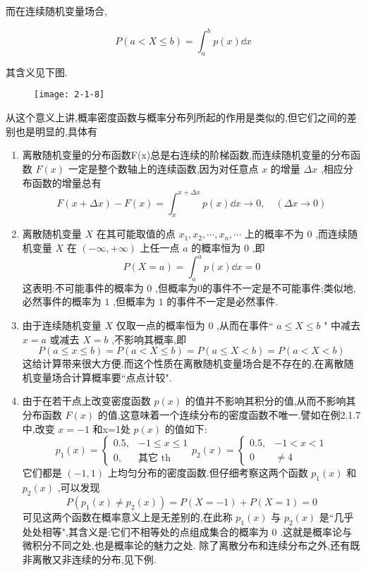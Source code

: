 而在连续随机变量场合,

\[ 
P(a<X \leqslant b)=\int_{a}^{b} p(x) \dd x
\]

其含义见下图.



\begin{figure}
	\centering
	\texttt{[image: 2-1-8]}
	\caption{}
	\label{fig:2.1.8}
\end{figure}

从这个意义上讲,概率密度函数与概率分布列所起的作用是类似的,但它们之间的差别也是明显的,具体有

\begin{enumerate}
	\item 离散随机变量的分布函数F(x)总是右连续的阶梯函数,而连续随机变量的分布函数 $ F(x) $ 一定是整个数轴上的连续函数,因为对任意点 $ x $ 的增量 $ \Delta x $ ,相应分布函数的增量总有
	\[ 
	F(x+\Delta x)-F(x)=\int_{x}^{x+\Delta x} p(x) \dd x \longrightarrow 0, \quad(\Delta x \rightarrow 0)
	\]
	\item 离散随机变量 $ X $ 在其可能取值的点 $ x_{1}, x_{2}, \cdots, x_{n}, \cdots $ 上的概率不为 $ 0 $ ,而连续随机变量 $ X $ 在 $ (-\infty,+\infty) $ 上任一点 $ a $ 的概率恒为 $ 0 $ ,即
	\[ 
	P(X=a)=\int_{a}^{a} p(x) \dd x=0
	\]
	这表明:不可能事件的概率为 $ 0 $ ,但概率为0的事件不一定是不可能事件;类似地,必然事件的概率为 $ 1 $ ,但概率为 $ 1 $ 的事件不一定是必然事件.
	\item 由于连续随机变量 $ X $ 仅取一点的概率恒为 $ 0 $ ,从而在事件`` $ a \leqslant X \leqslant b $ "
	中减去 $ x=a $ 或减去 $ X=b $ ,不影响其概率,即
	\[ 
	P(a \leqslant x \leqslant b)=P(a<X \leqslant b)=P(a \leqslant X<b)=P(a<X<b)
	\]
	这给计算带来很大方便.而这个性质在离散随机变量场合是不存在的,在离散随机变量场合计算概率要``点点计较".
	\item 由于在若干点上改变密度函数 $ p(x) $ 的值并不影响其积分的值,从而不影响其分布函数 $ F(x) $ 的值,这意味着一个连续分布的密度函数不唯一.譬如在例2.1.7中,改变 $ x=-1 $ 和x=1处 $ p(x) $ 的值如下:
	\[ 
	p_{1}(x)=\left\{\begin{array}{ll}{0.5,} & {-1 \leqslant x \leqslant 1} \\ {0,} & {\text{其它} \text { th }}\end{array}\right. p_{2}(x)=\left\{\begin{array}{ll}{0.5,} & {-1<x<1} \\ {0} & { \neq 4}\end{array}\right.
	\]
	它们都是 $ (-1,1) $ 上均匀分布的密度函数.但仔细考察这两个函数 $ p_1(x) $ 和 $ p_2(x) $ ,可以发现
	\[ 
	P\left(p_{1}(x) \neq p_{2}(x)\right)=P(X=-1)+P(X=1)=0
	\]
	可见这两个函数在概率意义上是无差别的,在此称 $ p_1(x) $ 与 $ p_2(x) $ 是``几乎处处相等",其含义是:它们不相等处的点组成集合的概率为 $ 0 $ .这就是概率论与微积分不同之处,也是概率论的魅力之处.
	除了离散分布和连续分布之外,还有既非离散又非连续的分布,见下例.
\end{enumerate}

